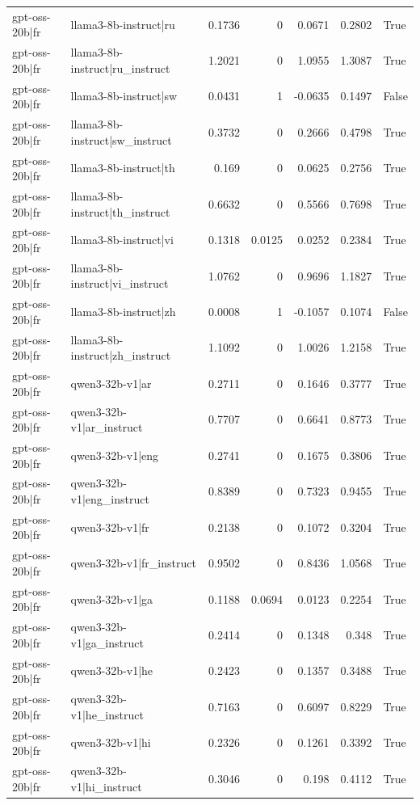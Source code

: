 \begin{table}
\begin{tabular}{l l r r r r l}
gpt-oss-20b|fr & llama3-8b-instruct|ru & 0.1736 & 0 & 0.0671 & 0.2802 & True \\
gpt-oss-20b|fr & llama3-8b-instruct|ru_instruct & 1.2021 & 0 & 1.0955 & 1.3087 & True \\
gpt-oss-20b|fr & llama3-8b-instruct|sw & 0.0431 & 1 & -0.0635 & 0.1497 & False \\
gpt-oss-20b|fr & llama3-8b-instruct|sw_instruct & 0.3732 & 0 & 0.2666 & 0.4798 & True \\
gpt-oss-20b|fr & llama3-8b-instruct|th & 0.169 & 0 & 0.0625 & 0.2756 & True \\
gpt-oss-20b|fr & llama3-8b-instruct|th_instruct & 0.6632 & 0 & 0.5566 & 0.7698 & True \\
gpt-oss-20b|fr & llama3-8b-instruct|vi & 0.1318 & 0.0125 & 0.0252 & 0.2384 & True \\
gpt-oss-20b|fr & llama3-8b-instruct|vi_instruct & 1.0762 & 0 & 0.9696 & 1.1827 & True \\
gpt-oss-20b|fr & llama3-8b-instruct|zh & 0.0008 & 1 & -0.1057 & 0.1074 & False \\
gpt-oss-20b|fr & llama3-8b-instruct|zh_instruct & 1.1092 & 0 & 1.0026 & 1.2158 & True \\
gpt-oss-20b|fr & qwen3-32b-v1|ar & 0.2711 & 0 & 0.1646 & 0.3777 & True \\
gpt-oss-20b|fr & qwen3-32b-v1|ar_instruct & 0.7707 & 0 & 0.6641 & 0.8773 & True \\
gpt-oss-20b|fr & qwen3-32b-v1|eng & 0.2741 & 0 & 0.1675 & 0.3806 & True \\
gpt-oss-20b|fr & qwen3-32b-v1|eng_instruct & 0.8389 & 0 & 0.7323 & 0.9455 & True \\
gpt-oss-20b|fr & qwen3-32b-v1|fr & 0.2138 & 0 & 0.1072 & 0.3204 & True \\
gpt-oss-20b|fr & qwen3-32b-v1|fr_instruct & 0.9502 & 0 & 0.8436 & 1.0568 & True \\
gpt-oss-20b|fr & qwen3-32b-v1|ga & 0.1188 & 0.0694 & 0.0123 & 0.2254 & True \\
gpt-oss-20b|fr & qwen3-32b-v1|ga_instruct & 0.2414 & 0 & 0.1348 & 0.348 & True \\
gpt-oss-20b|fr & qwen3-32b-v1|he & 0.2423 & 0 & 0.1357 & 0.3488 & True \\
gpt-oss-20b|fr & qwen3-32b-v1|he_instruct & 0.7163 & 0 & 0.6097 & 0.8229 & True \\
gpt-oss-20b|fr & qwen3-32b-v1|hi & 0.2326 & 0 & 0.1261 & 0.3392 & True \\
gpt-oss-20b|fr & qwen3-32b-v1|hi_instruct & 0.3046 & 0 & 0.198 & 0.4112 & True \\

\end{tabular}
\end{table}
